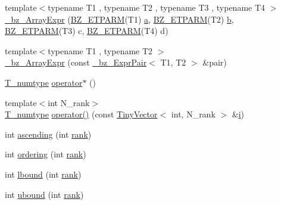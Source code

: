 \begin{DoxyCompactItemize}
\item 
{\footnotesize template$<$typename T1 , typename T2 , typename T3 , typename T4 $>$ }\\\hyperlink{class__bz__ArrayExpr_ab7a249b51007d90d471a8a5ae2141744}{\+\_\+bz\+\_\+\+Array\+Expr} (\hyperlink{tuning_8h_a92a6f3aa8f4cd5ac9b4239c449892bb7}{B\+Z\+\_\+\+E\+T\+P\+A\+R\+M}(T1) \hyperlink{gen__mat5files_8m_aae328bf20413f220e38aec4d95bfd6da}{a}, \hyperlink{tuning_8h_a92a6f3aa8f4cd5ac9b4239c449892bb7}{B\+Z\+\_\+\+E\+T\+P\+A\+R\+M}(T2) \hyperlink{gen__mat5files_8m_a7b38767b3b6a8dae167e5afa4fc340b0}{b}, \hyperlink{tuning_8h_a92a6f3aa8f4cd5ac9b4239c449892bb7}{B\+Z\+\_\+\+E\+T\+P\+A\+R\+M}(T3) c, \hyperlink{tuning_8h_a92a6f3aa8f4cd5ac9b4239c449892bb7}{B\+Z\+\_\+\+E\+T\+P\+A\+R\+M}(T4) d)
\item 
{\footnotesize template$<$typename T1 , typename T2 $>$ }\\\hyperlink{class__bz__ArrayExpr_a3310e58fdbc4cb2c8388df53c0519051}{\+\_\+bz\+\_\+\+Array\+Expr} (const \hyperlink{class__bz__ExprPair}{\+\_\+bz\+\_\+\+Expr\+Pair}$<$ T1, T2 $>$ \&pair)
\item 
\hyperlink{class__bz__ArrayExpr_afa1ec55de102cafbc549da90093af10b}{T\+\_\+numtype} \hyperlink{class__bz__ArrayExpr_a41fc1a5c2a3f5c5da25d651b95917099}{operator$\ast$} ()
\item 
{\footnotesize template$<$int N\+\_\+rank$>$ }\\\hyperlink{class__bz__ArrayExpr_afa1ec55de102cafbc549da90093af10b}{T\+\_\+numtype} \hyperlink{class__bz__ArrayExpr_aee68a8d7a0547a9d187843ed05afa4f9}{operator()} (const \hyperlink{classTinyVector}{Tiny\+Vector}$<$ int, N\+\_\+rank $>$ \&\hyperlink{indexexpr_8h_aabd77643995707c185e95c8cb2782c81}{i})
\item 
int \hyperlink{class__bz__ArrayExpr_a2d9b93ffa7d43b10351b1871796670ba}{ascending} (int \hyperlink{class__bz__ArrayExpr_aba2f516b84f2a7a0c04e0d01dbba3fd3}{rank})
\item 
int \hyperlink{class__bz__ArrayExpr_ace4ace3a15aa673e0f941efa45164532}{ordering} (int \hyperlink{class__bz__ArrayExpr_aba2f516b84f2a7a0c04e0d01dbba3fd3}{rank})
\item 
int \hyperlink{class__bz__ArrayExpr_abe9e9e2f5ad57737ead1cf5ff89d1ad3}{lbound} (int \hyperlink{class__bz__ArrayExpr_aba2f516b84f2a7a0c04e0d01dbba3fd3}{rank})
\item 
int \hyperlink{class__bz__ArrayExpr_a742484b0836ebf6b17e4944f9c820f42}{ubound} (int \hyperlink{class__bz__ArrayExpr_aba2f516b84f2a7a0c04e0d01dbba3fd3}{rank})
\item 

\end{DoxyCompactItemize}
